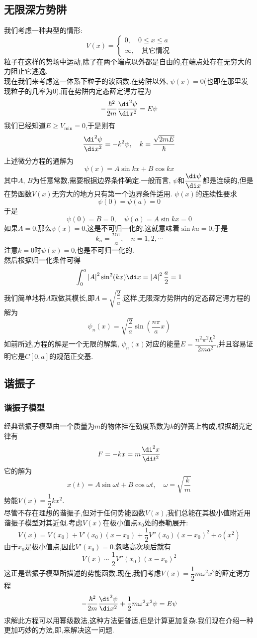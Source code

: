 \documentclass{ctexart}
\begin{document}
\subsection{无限深方势阱}
我们考虑一种典型的情形:
\[V(x)=\left\{\begin{array}{l}
    0,\quad0\leq x\leq a\\
    \infty,\quad\text{其它情况}
\end{array}\right.\]
粒子在这样的势场中运动,除了在两个端点以外都是自由的,在端点处存在无穷大的力阻止它逃逸.\\
\indent 现在我们来考虑这一体系下粒子的波函数.在势阱以外, $\psi(x)=0$(也即在那里发现粒子的几率为$0$),而在势阱内定态薛定谔方程为
\[-\dfrac{\hbar^2}{2m}\dfrac{\di^2\psi}{\di x^2}=E\psi\]
我们已经知道$E\geq V_{\min}=0$,于是则有
\[\dfrac{\di^2\psi}{\di x^2}=-k^2\psi,\quad k=\dfrac{\sqrt{2mE}}{\hbar}\]
上述微分方程的通解为
\[\psi(x)=A\sin kx+B\cos kx\]
其中$A$, $B$为任意常数,需要根据边界条件确定.一般而言, $\psi$和$\dfrac{\di\psi}{\di x}$都是连续的,但是在势函数$V(x)$无穷大的地方只有第一个边界条件适用. $\psi(x)$的连续性要求
\[\psi(0)=\psi(a)=0\]
于是
\[\psi(0)=B=0,\quad \psi(a)=A\sin kx=0\]
如果$A=0$,那么$\psi(x)=0$,这是不可归一化的.这就意味着$\sin ka=0$,于是
\[k_n=\dfrac{n\pi}{a},\quad n=1,2,\cdots\]
注意$k=0$时$\psi(x)=0$,也是不可归一化的.\\
\indent 然后根据归一化条件可得
\[\int_0^a\left|A\right|^2\sin^2(kx)\di x=\left|A\right|^2\dfrac{a}{2}=1\]
我们简单地将$A$取做其模长,即$A=\sqrt{\dfrac{2}{a}}$.这样,无限深方势阱内的定态薛定谔方程的解为
\[\psi_n(x)=\sqrt{\dfrac{2}{a}}\sin\left(\dfrac{n\pi}{a}x\right)\]
\indent 如前所述,方程的解是一个无限的解集, $\psi_n(x)$对应的能量$E=\dfrac{n^2\pi^2\hbar^2}{2ma^2}$,并且容易证明它是$C[0,a]$的规范正交基.
\subsection{谐振子}
\subsubsection{谐振子模型}
经典谐振子模型由一个质量为$m$的物体挂在劲度系数为$k$的弹簧上构成,根据胡克定律有
\[F=-kx=m\dfrac{\di^2 x}{\di t^2}\]
它的解为
\[x(t)=A\sin\omega t+B\cos\omega t,\quad\omega=\sqrt{\dfrac{k}{m}}\]
势能$V(x)=\dfrac12kx^2$.\\
\indent 尽管不存在理想的谐振子,但对于任何势能函数$V(x)$,我们总能在其极小值附近用谐振子模型对其近似.考虑$V(x)$在极小值点$x_0$处的泰勒展开:
\[V(x)=V(x_0)+V'(x_0)(x-x_0)+\dfrac12V''(x_0)(x-x_0)^2+o(x^2)\]
由于$x_0$是极小值点,因此$V'(x_0)=0$.忽略高次项后就有
\[V(x)\sim\dfrac12V''(x_0)(x-x_0)^2\]
这正是谐振子模型所描述的势能函数.现在,我们考虑$V(x)=\dfrac12m\omega^2x^2$的薛定谔方程
\[-\dfrac{\hbar^2}{2m}\dfrac{\di^2\psi}{\di x^2}+\dfrac12m\omega^2x^2\psi=E\psi\]
求解此方程可以用幂级数法,这种方法更普适,但是计算更加复杂.我们现在介绍一种更加巧妙的方法,即,来解决这一问题.
\end{document}
